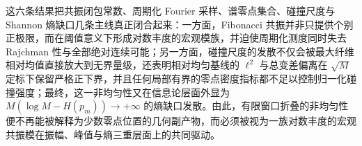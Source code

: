 \noindent
这六条结果把共振闭包常数、周期化 Fourier 采样、谱零点集合、碰撞尺度与 Shannon 熵缺口几条主线真正闭合起来：一方面，Fibonacci 共振并非只提供个别正极限，而在阈值意义下形成对数丰度的宏观模族，并迫使周期化测度同时失去 Rajchman 性与全部绝对连续可能；另一方面，碰撞尺度的发散不仅会被最大纤维相对均值直接放大到无界量级，还表明相对均匀基线的 \(\ell^2\) 与总变差偏离在 \(\sqrt{M}\) 定标下保留严格正下界，并且任何局部有界的零点密度指标都不足以控制归一化碰撞强度；最终，这一非均匀性又在信息论层面外显为 \(M(\log M-H(p_m))\to+\infty\) 的熵缺口发散。由此，有限窗口折叠的非均匀性便不再能被解释为少数零点位置的几何副产物，而必须被视为一族对数丰度的宏观共振模在振幅、峰值与熵三重层面上的共同驱动。



\endinput
